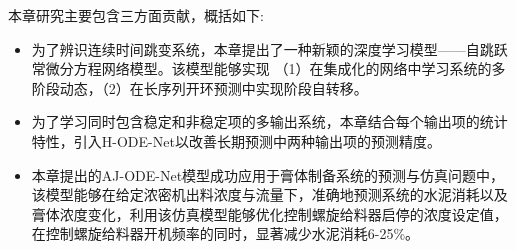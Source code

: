 本章研究主要包含三方面贡献，概括如下:
\begin{itemize}
    \item 为了辨识连续时间跳变系统，本章提出了一种新颖的深度学习模型——自跳跃常微分方程网络模型。该模型能够实现
    （1）在集成化的网络中学习系统的多阶段动态，（2）在长序列开环预测中实现阶段自转移。
    \item 为了学习同时包含稳定和非稳定项的多输出系统，本章结合每个输出项的统计特性，引入H-ODE-Net以改善长期预测中两种输出项的预测精度。
    \item 本章提出的AJ-ODE-Net模型成功应用于膏体制备系统的预测与仿真问题中，该模型能够在给定浓密机出料浓度与流量下，准确地预测系统的水泥消耗以及膏体浓度变化，利用该仿真模型能够优化控制螺旋给料器启停的浓度设定值，在控制螺旋给料器开机频率的同时，显著减少水泥消耗6-25\%。
\end{itemize}

